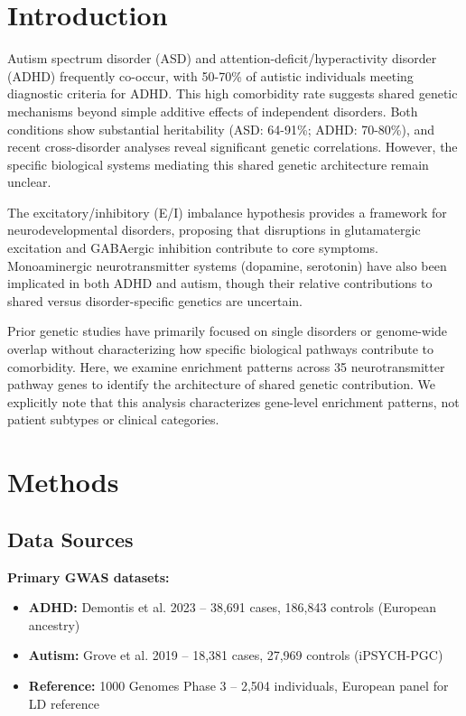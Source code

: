 \documentclass[12pt,letterpaper]{article}
\theoremstyle{definition}
\theoremstyle{remark}
\begin{document}
\newpage
\tableofcontents
\newpage

\section{Introduction}

Autism spectrum disorder (ASD) and attention-deficit/hyperactivity disorder (ADHD) frequently co-occur, with 50-70\% of autistic individuals meeting diagnostic criteria for ADHD\cite{antshel2016}. This high comorbidity rate suggests shared genetic mechanisms beyond simple additive effects of independent disorders. Both conditions show substantial heritability (ASD: 64-91\%; ADHD: 70-80\%)\cite{tick2016,demontis2023}, and recent cross-disorder analyses reveal significant genetic correlations\cite{pgc2019,lee2013}. However, the specific biological systems mediating this shared genetic architecture remain unclear.

The excitatory/inhibitory (E/I) imbalance hypothesis provides a framework for neurodevelopmental disorders, proposing that disruptions in glutamatergic excitation and GABAergic inhibition contribute to core symptoms\cite{rubenstein2003}. Monoaminergic neurotransmitter systems (dopamine, serotonin) have also been implicated in both ADHD and autism\cite{volkow2009,muller2016}, though their relative contributions to shared versus disorder-specific genetics are uncertain.

Prior genetic studies have primarily focused on single disorders or genome-wide overlap without characterizing how specific biological pathways contribute to comorbidity. Here, we examine enrichment patterns across 35 neurotransmitter pathway genes to identify the architecture of shared genetic contribution. We explicitly note that this analysis characterizes gene-level enrichment patterns, not patient subtypes or clinical categories.

\section{Methods}

\subsection{Data Sources}

\textbf{Primary GWAS datasets:}
\begin{itemize}
    \item \textbf{ADHD:} Demontis et al. 2023\cite{demontis2023} -- 38,691 cases, 186,843 controls (European ancestry)
    \item \textbf{Autism:} Grove et al. 2019\cite{grove2019} -- 18,381 cases, 27,969 controls (iPSYCH-PGC)
    \item \textbf{Reference:} 1000 Genomes Phase 3\cite{genomes2015} -- 2,504 individuals, European panel for LD reference
\end{itemize}
\end{document}
